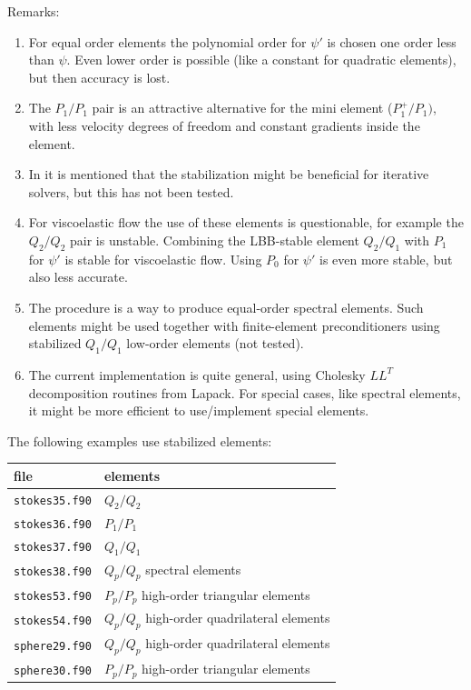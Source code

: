 Remarks:
\begin{enumerate}
   \item For equal order elements the polynomial order for $\psi'$ is chosen
   one order less than $\psi$. 
   Even lower order is possible (like a constant for quadratic elements), but
   then accuracy is lost.
   \item The $P_1/P_1$ pair is an attractive alternative for the mini element
   ($P_1^+/P_1)$, with less velocity degrees of freedom and constant gradients
   inside the element.
   \item In \cite{Dohrmann04} it is mentioned that the stabilization might be
   beneficial for iterative solvers, but this has not been tested.
   \item For viscoelastic flow the use of these elements is questionable, for
   example the $Q_2/Q_2$ pair is unstable. Combining the LBB-stable element
   $Q_2/Q_1$ with $P_1$ for $\psi'$ is stable for viscoelastic flow. Using 
   $P_0$ for $\psi'$ is even more stable, but also less accurate.
   \item The procedure is a way to produce equal-order spectral elements.
   Such elements might be used together with finite-element
   preconditioners using stabilized $Q_1/Q_1$ low-order elements (not tested).
 \item The current implementation is quite general, using Cholesky
   $LL^T$ decomposition routines from Lapack. For special cases, like spectral
   elements, it might be more efficient to use/implement special elements.
\end{enumerate}

The following examples use stabilized elements:\\\medskip
\begin{center}
 \begin{tabular}{ll}
  file& elements \\ \hline
\texttt{stokes35.f90} &$Q_2/Q_2$ \\
\texttt{stokes36.f90} &$P_1/P_1$ \\
\texttt{stokes37.f90} &$Q_1/Q_1$ \\
\texttt{stokes38.f90} &$Q_p/Q_p$ spectral elements\\
\texttt{stokes53.f90} &$P_p/P_p$ high-order triangular elements\\
\texttt{stokes54.f90} &$Q_p/Q_p$ high-order quadrilateral elements\\
\texttt{sphere29.f90} &$Q_p/Q_p$ high-order quadrilateral elements\\
\texttt{sphere30.f90} &$P_p/P_p$ high-order triangular elements
\end{tabular}
\end{center}
 
